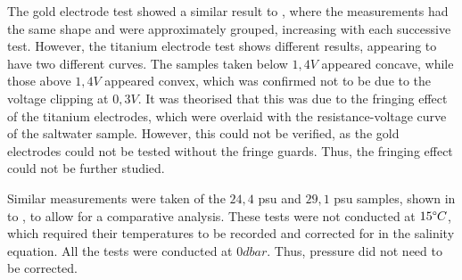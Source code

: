 The gold electrode test showed a similar result to , where the measurements had the same shape and were approximately grouped, increasing with each successive test.
However, the titanium electrode test shows different results, appearing to have two different curves.
The samples taken below $1,4V$ appeared concave, while those above $1,4V$ appeared convex, which was confirmed not to be due to the voltage clipping at $0,3V$.
It was theorised that this was due to the fringing effect of the titanium electrodes, which were overlaid with the resistance-voltage curve of the saltwater sample.
However, this could not be verified, as the gold electrodes could not be tested without the fringe guards. 
Thus, the fringing effect could not be further studied.

Similar measurements were taken of the $24,4$ \gls{psu} and $29,1$ \gls{psu} samples, shown in  to , to allow for a comparative analysis.
These tests were not conducted at $15\degree C$, which required their temperatures to be recorded and corrected for in the salinity equation.
All the tests were conducted at $0dbar$. 
Thus, pressure did not need to be corrected.

